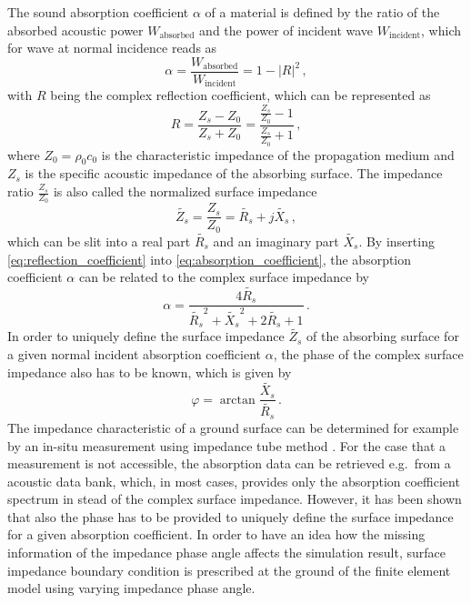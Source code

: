 {The sound absorption coefficient $\alpha$ of a material is defined by the ratio of the absorbed acoustic power $W_{\text{absorbed}}$ and the power of incident wave $W_{\text{incident}}$, which for wave at normal incidence reads as
\begin{equation}
	\alpha = \frac{W_{\text{absorbed}}}{W_\text{incident}} = 1 - |R|^2\,, \label{eq:absorption_coefficient}
\end{equation}
with $R$ being the complex reflection coefficient, which can be represented as
\begin{equation}
	R = \frac{Z_s - Z_0}{Z_s + Z_0} = \frac{\frac{Z_s}{Z_0} - 1}{\frac{Z_s}{Z_0} + 1}\,, \label{eq:reflection_coefficient}
\end{equation}
where $Z_0 = \rho_0 c_0$ is the characteristic impedance of the propagation medium and $Z_s$ is the specific acoustic impedance of the absorbing surface.
The impedance ratio $\frac{Z_s}{Z_0}$ is also called the normalized surface impedance
\begin{equation}
	\tilde{Z_s} = \frac{Z_s}{Z_0} = \tilde{R_s} + j\tilde{X_s}\,,
\end{equation}
which can be slit into a real part $\tilde{R_s}$ and an imaginary part $\tilde{X_s}$. By inserting \cref{eq:reflection_coefficient} into \cref{eq:absorption_coefficient}, the absorption coefficient $\alpha$ can be related to the complex surface impedance by
\begin{equation}
	\alpha = \frac{4\tilde{R_s}}{\tilde{R_s}^2+\tilde{X_s}^2 + 2\tilde{R_s} + 1} \,. \label{eq:absorption_coefficient_2}
\end{equation}
In order to uniquely define the surface impedance $\tilde{Z_s}$ of the absorbing surface for a given normal incident absorption coefficient $\alpha$, the phase of the complex surface impedance also has to be known, which is given by
\begin{equation}
	 \varphi = \arctan{\frac{\tilde{X_s}}{\tilde{R_s}}}\,. \label{eq:impedance_phase_angle}
\end{equation}
The impedance characteristic of a ground surface can be determined for example by an in-situ measurement using impedance tube method \cite{wolkesson_2013,Seybert2008MeasurementOP}.
For the case that a measurement is not accessible, the absorption data can be retrieved e.g.\ from a acoustic data bank, which, in most cases, provides only the absorption coefficient spectrum in stead of the complex surface impedance.
However, it has been shown that also the phase has to be provided to uniquely define the surface impedance for a given absorption coefficient.
In order to have an idea how the missing information of the impedance phase angle affects the simulation result, surface impedance boundary condition is prescribed at the ground of the finite element model using varying impedance phase angle.

}
